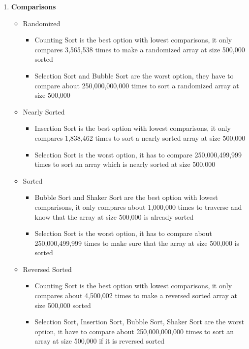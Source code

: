\documentclass[11pt,a4paper]{article}
\begin{document}
{{\begin{enumerate}
\begin{itemize}
\begin{itemize}
	                \end{itemize}
	            \end{itemize}
	        \item \textbf{Comparisons}
	            \begin{itemize}
	                \item Randomized 
	                \begin{itemize}
	                    \item Counting Sort is the best option with lowest comparisons, it only compares 3,565,538 times to make a randomized array at size 500,000 sorted
	                    \item Selection Sort and Bubble Sort are the worst option, they have to compare about 250,000,000,000 times to sort a randomized array at size 500,000
	                \end{itemize}
	                \item Nearly Sorted
	                \begin{itemize}
	                    \item Insertion Sort is the best option with lowest comparisons, it only compares 1,838,462 times to sort a nearly sorted array at size 500,000
	                    \item Selection Sort is the worst option, it has to compare 250,000,499,999 times to sort an array which is nearly sorted at size 500,000
	                \end{itemize}
	                \item Sorted
	                \begin{itemize}
	                    \item Bubble Sort and Shaker Sort are the best option with lowest comparisons, it only compares about 1,000,000 times to traverse and know that the array at size 500,000 is already sorted
	                    \item Selection Sort is the worst option, it has to compare about 250,000,499,999 times to make sure that the array at size 500,000 is sorted
	                \end{itemize}
	                \item Reversed Sorted
	                \begin{itemize}
	                    \item Counting Sort is the best option with lowest comparisons, it only compares about 4,500,002 times to make a reversed sorted array at size 500,000 sorted
	                    \item Selection Sort, Insertion Sort, Bubble Sort, Shaker Sort are the worst option, it have to compare about 250,000,000,000 times to sort an array at size 500,000 if it is reversed sorted
	                \end{itemize}
	            \end{itemize}
	    \end{enumerate}
	
}}
\end{document}
